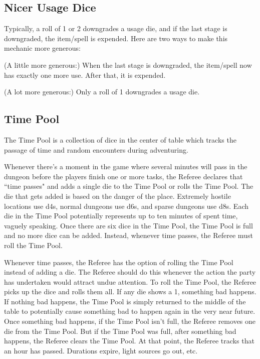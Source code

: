 \documentclass[twoside]{article}
\begin{document}
\subsection*{Nicer Usage Dice}

Typically, a roll of 1 or 2 downgrades a usage die, and if the last stage is downgraded, the item/spell is expended. Here are two ways to make this mechanic more generous:

\bigbreak

(A little more generous:) When the last stage is downgraded, the item/spell now has exactly one more use. After that, it is expended.

\bigbreak

(A lot more generous:) Only a roll of 1 downgrades a usage die.

\subsection*{Time Pool}

The Time Pool is a collection of dice in the center of table which tracks the passage of time and random encounters during adventuring.

\bigbreak

Whenever there’s a moment in the game where several minutes will pass in the dungeon before the players finish one or more tasks, the Referee declares that ``time passes" and adds a single die to the Time Pool or rolls the Time Pool. The die that gets added is based on the danger of the place. Extremely hostile locations use d4s, normal dungeons use d6s, and sparse dungeons use d8s. Each die in the Time Pool potentially represents up to ten minutes of spent time, vaguely speaking. Once there are six dice in the Time Pool, the Time Pool is full and no more dice can be added. Instead, whenever time passes, the Referee must roll the Time Pool.

\bigbreak

Whenever time passes, the Referee has the option of rolling the Time Pool instead of adding a die. The Referee should do this whenever the action the party has undertaken would attract undue attention. To roll the Time Pool, the Referee picks up the dice and rolls them all. If any die shows a 1, something bad happens. If nothing bad happens, the Time Pool is simply returned to the middle of the table to potentially cause something bad to happen again in the very near future. Once something bad happens, if the Time Pool isn’t full, the Referee removes one die from the Time Pool. But if the Time Pool was full, after something bad happens, the Referee clears the Time Pool. At that point, the Referee tracks that an hour has passed. Durations expire, light sources go out, etc.
\end{document}
